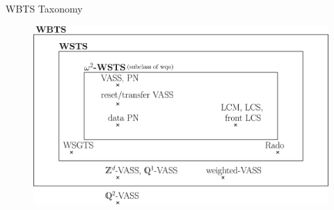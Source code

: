 \documentclass{beamer}
\begin{document}
  \begin{frame}{WBTS Taxonomy}
  
   \begin{center}
 	\begin{figure}
\includegraphics[width=.80\textwidth]{WSTS_taxonomy_large}
	\end{figure}
\end{center}  




  \end{frame}
\end{document}
